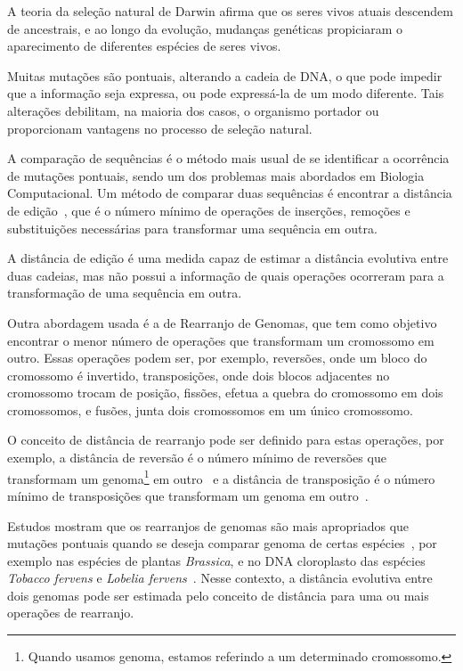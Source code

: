 A teoria da seleção natural de Darwin afirma que os seres vivos atuais
descendem de ancestrais, e ao longo da evolução, mudanças genéticas
propiciaram o aparecimento de diferentes espécies de seres vivos. 

Muitas mutações são pontuais, alterando a cadeia de DNA, o que pode
impedir que a informação seja expressa, ou pode expressá-la de um modo
diferente. Tais alterações debilitam, na maioria dos casos, o organismo
portador ou proporcionam vantagens no processo de seleção natural.

A comparação de sequências é o método mais usual de se identificar a
ocorrência de mutações pontuais, sendo um dos problemas mais abordados
em Biologia Computacional. Um método de comparar duas sequências é
encontrar a distância de edição~\cite{SetubalMeidanis*1997}, que é o
número mínimo de operações de inserções, remoções e substituições
necessárias para transformar uma sequência em outra. 

A distância de edição é uma medida capaz de estimar a distância
evolutiva entre duas cadeias, mas não possui a informação de quais
operações ocorreram para a transformação de uma sequência em outra.

Outra abordagem usada é a de Rearranjo de Genomas, que tem como objetivo
encontrar o menor número de operações que transformam um cromossomo em
outro. Essas operações podem ser, por exemplo, reversões, onde um bloco
do cromossomo é invertido, transposições, onde dois blocos adjacentes no
cromossomo trocam de posição, fissões, efetua a quebra do cromossomo em
dois cromossomos, e fusões, junta dois cromossomos em um único
cromossomo.

O conceito de distância de rearranjo pode ser definido para estas
operações, por exemplo, a distância de reversão é o número mínimo de
reversões que transformam um genoma\footnote{Quando usamos genoma,
estamos referindo a um determinado cromossomo.} em
outro~\cite{BafnaPevzner*1996} e a distância de transposição é o número
mínimo de transposições que transformam um genoma em
outro~\cite{BafnaPevzner*1998}. 

Estudos mostram que os rearranjos de genomas são mais apropriados que
mutações pontuais quando se deseja comparar genoma de certas
espécies~\cite{PalmerHerbon*1988}, por exemplo nas espécies de plantas
\textit{Brassica}, e no DNA cloroplasto das espécies \textit{Tobacco
fervens} e \textit{Lobelia fervens}~\cite{BafnaPevzner*1996}. Nesse
contexto, a distância evolutiva entre dois genomas pode ser estimada
pelo conceito de distância para uma ou mais operações de rearranjo.

